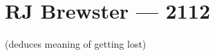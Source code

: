 \hypertarget{rj-brewster-2112}{%
\chapter*{RJ Brewster — 2112}\label{rj-brewster-2112}}

(deduces meaning of getting lost)
